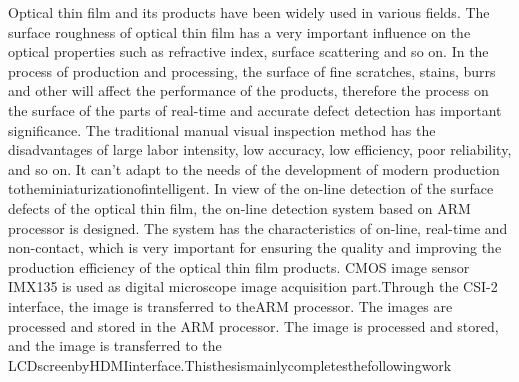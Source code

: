 \begin{enabstract}
	Optical thin film and its products have been widely used in various fields. The surface roughness of optical thin film has a very important influence on the optical properties such as refractive index, surface scattering and so on. In the process of production and processing, the surface of fine scratches, stains, burrs and other will affect the performance of the products, therefore the process on the surface of the parts of real-time and accurate defect detection has important significance. The traditional manual visual inspection method has the disadvantages of large labor intensity, low accuracy, low efficiency, poor reliability, and so on. It can’t adapt to the needs of the development of modern production totheminiaturizationofintelligent. In view of the on-line detection of the surface defects of the optical thin film, the on-line detection system based on ARM processor is designed. The system has the characteristics of on-line, real-time and non-contact, which is very important for ensuring the quality and improving the production efficiency of the optical thin film products. CMOS image sensor IMX135 is used as digital microscope image acquisition part.Through the CSI-2 interface, the image is transferred to theARM processor. The images are processed and stored in the ARM processor. The image is processed and stored, and the image is transferred to the LCDscreenbyHDMIinterface.Thisthesismainlycompletesthefollowingwork
  

\end{enabstract}
